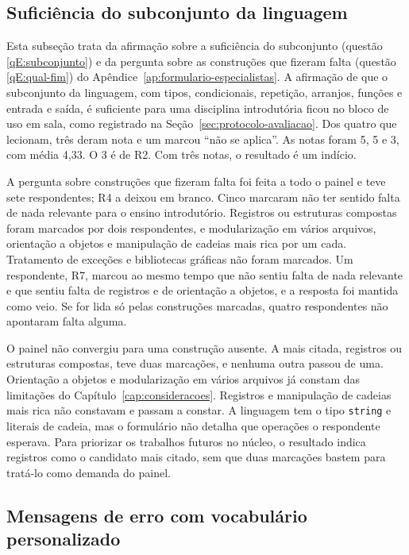 \subsection{Suficiência do subconjunto da linguagem}
\label{sec:resultado-subconjunto}

Esta subseção trata da afirmação sobre a suficiência do subconjunto (questão \ref{qE:subconjunto}) e da pergunta sobre as construções que fizeram falta (questão \ref{qE:qual-fim}) do Apêndice~\ref{ap:formulario-especialistas}. A afirmação de que o subconjunto da linguagem, com tipos, condicionais, repetição, arranjos, funções e entrada e saída, é suficiente para uma disciplina introdutória ficou no bloco de uso em sala, como registrado na Seção~\ref{sec:protocolo-avaliacao}. Dos quatro que lecionam, três deram nota e um marcou ``não se aplica''. As notas foram 5, 5 e 3, com média 4,33. O 3 é de R2. Com três notas, o resultado é um indício.

A pergunta sobre construções que fizeram falta foi feita a todo o painel e teve sete respondentes; R4 a deixou em branco. Cinco marcaram não ter sentido falta de nada relevante para o ensino introdutório. Registros ou estruturas compostas foram marcados por dois respondentes, e modularização em vários arquivos, orientação a objetos e manipulação de cadeias mais rica por um cada. Tratamento de exceções e bibliotecas gráficas não foram marcados. Um respondente, R7, marcou ao mesmo tempo que não sentiu falta de nada relevante e que sentiu falta de registros e de orientação a objetos, e a resposta foi mantida como veio. Se for lida só pelas construções marcadas, quatro respondentes não apontaram falta alguma.

O painel não convergiu para uma construção ausente. A mais citada, registros ou estruturas compostas, teve duas marcações, e nenhuma outra passou de uma. Orientação a objetos e modularização em vários arquivos já constam das limitações do Capítulo~\ref{cap:consideracoes}. Registros e manipulação de cadeias mais rica não constavam e passam a constar. A linguagem tem o tipo \texttt{string} e literais de cadeia, mas o formulário não detalha que operações o respondente esperava. Para priorizar os trabalhos futuros no núcleo, o resultado indica registros como o candidato mais citado, sem que duas marcações bastem para tratá-lo como demanda do painel.

\subsection{Mensagens de erro com vocabulário personalizado}
\label{sec:resultado-diagnosticos}

